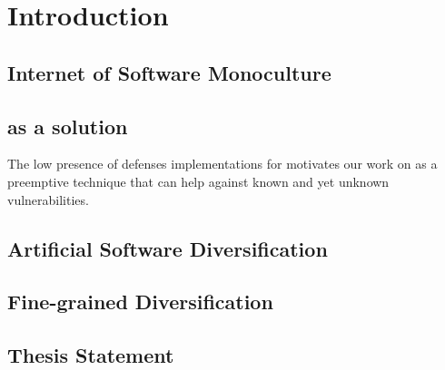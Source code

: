 \chapter{Introduction}







\newcommand{\subscript}[2]{$#1 _ #2$}

\newcommand{\rqone}{RQ1. To what extent can we artifically generate program variants for \wasm?}

\newcommand{\rqtwo}{RQ2. To what extent are the generated variants dynamically different?}
\newcommand{\rqthree}{RQ3. To what extent do the artificial variants exhibit different execution times on Edge-Cloud platforms?}


\section*{Internet of Software Monoculture}

\section*{as a solution}

The low presence of defenses implementations for \wasm motivates our work on as a preemptive technique that can help against known and yet unknown vulnerabilities.

\section*{Artificial Software Diversification}


\section*{Fine-grained Diversification}

\section{Thesis Statement}


